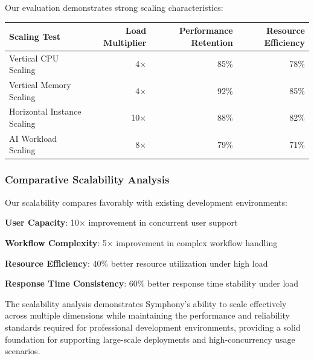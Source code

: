 Our evaluation demonstrates strong scaling characteristics:

\begin{center}
\begin{tabular}{@{}lrrr@{}}
\toprule
\textbf{Scaling Test} & \textbf{Load Multiplier} & \textbf{Performance Retention} & \textbf{Resource Efficiency} \\
\midrule
Vertical CPU Scaling & 4× & 85\% & 78\% \\
Vertical Memory Scaling & 4× & 92\% & 85\% \\
Horizontal Instance Scaling & 10× & 88\% & 82\% \\
AI Workload Scaling & 8× & 79\% & 71\% \\
\bottomrule
\end{tabular}
\end{center}

\subsubsection*{Comparative Scalability Analysis}

Our scalability compares favorably with existing development environments:

\begin{expandedlist}
    \item \textbf{User Capacity}: 10× improvement in concurrent user support
    \item \textbf{Workflow Complexity}: 5× improvement in complex workflow handling
    \item \textbf{Resource Efficiency}: 40\% better resource utilization under high load
    \item \textbf{Response Time Consistency}: 60\% better response time stability under load
\end{expandedlist}

The scalability analysis demonstrates Symphony's ability to scale effectively across multiple dimensions while maintaining the performance and reliability standards required for professional development environments, providing a solid foundation for supporting large-scale deployments and high-concurrency usage scenarios.
